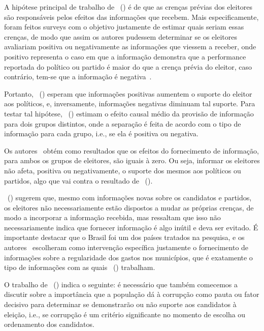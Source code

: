 \documentclass[
	12pt,				%
	openright,			%
	twoside,			%
	a4paper,			%
	openany,
	english,			%
	brazil				%
	]{abntex2}
\begin{document}
A hipótese principal de trabalho de ~(\citeyear{dunning2019voter}) é de que as crenças prévias dos eleitores são responsáveis pelos efeitos das informações que recebem. Mais especificamente, foram feitos surveys com o objetivo justamente de estimar quais seriam essas crenças, de modo que assim os autores pudessem determinar se os eleitores avaliariam positiva ou negativamente as informações que viessem a receber, onde positivo representa o caso em que a informação demonstra que a performance reportada do político ou partido é maior do que a crença prévia do eleitor, caso contrário, tem-se que a informação é negativa~\cite{dunning2019voter}.

Portanto, ~(\citeyear{dunning2019voter}) esperam que informações positivas aumentem o suporte do eleitor aos políticos, e, inversamente, informações negativas diminuam tal suporte. Para testar tal hipótese, ~(\citeyear{dunning2019voter}) estimam o efeito causal médio da provisão de informação para dois grupos distintos, onde a separação é feita de acordo com o tipo de informação para cada grupo, i.e., se ela é positiva ou negativa.

Os autores~\cite{dunning2019voter} obtém como resultados que os efeitos do fornecimento de informação, para ambos os grupos de eleitores, são iguais à zero. Ou seja, informar os eleitores não afeta, positiva ou negativamente, o suporte dos mesmos aos políticos ou partidos, algo que vai contra o resultado de ~(\citeyear{ferraz2008exposing}).

~(\citeyear{dunning2019voter}) sugerem que, mesmo com informações novas sobre os candidatos e partidos, os eleitores não necessariamente estão dispostos a mudar as próprias crenças, de modo a incorporar a informação recebida, mas ressaltam que isso não necessariamente indica que fornecer informação é algo inútil e deva ser evitado. É importante destacar que o Brasil foi um dos países tratados na pesquisa, e os autores~\cite{dunning2019voter} escolheram como intervenção específica justamente o fornecimento de informações sobre a regularidade dos gastos nos municípios, que é exatamente o tipo de informações com as quais ~(\citeyear{ferraz2008exposing}) trabalham.

O trabalho de ~(\citeyear{dunning2019voter}) indica o seguinte: é necessário que também comecemos a discutir sobre a importância que a população dá à corrupção como pauta ou fator decisivo para determinar se demonstrarão ou não suporte aos candidatos à eleição, i.e., se corrupção é um critério significante no momento de escolha ou ordenamento dos candidatos.
\end{document}
